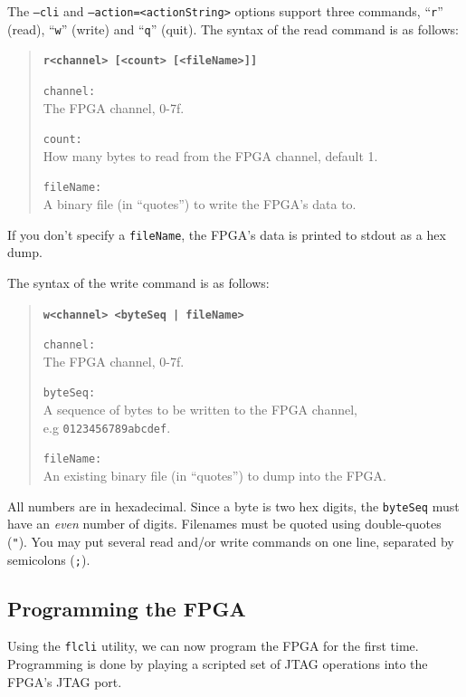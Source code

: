 \newpage
The \texttt{--cli} and \texttt{--action=<actionString>} options support three commands, ``\texttt{r}'' (read), ``\texttt{w}'' (write) and ``\texttt{q}'' (quit). The syntax of the read command is as follows:

\begin{quote}
\textbf{\texttt{r<channel> [<count> [<fileName>]]}}

\begin{desc}
  \item[\texttt{channel:}] \hfill \\
    The FPGA channel, 0-7f.
  \item[\texttt{count:}] \hfill \\
    How many bytes to read from the FPGA channel, default 1.
  \item[\texttt{fileName:}] \hfill \\
    A binary file (in ``quotes'') to write the FPGA's data to.
\end{desc}
\end{quote}

If you don't specify a \texttt{fileName}, the FPGA's data is printed to stdout as a hex dump.

The syntax of the write command is as follows:

\begin{quote}
\textbf{\texttt{w<channel> <byteSeq | fileName>}}

\begin{desc}
  \item[\texttt{channel:}] \hfill \\
    The FPGA channel, 0-7f.
  \item[\texttt{byteSeq:}] \hfill \\
    A sequence of bytes to be written to the FPGA channel,\\e.g \texttt{0123456789abcdef}.
  \item[\texttt{fileName:}] \hfill \\
    An existing binary file (in ``quotes'') to dump into the FPGA.
\end{desc}
\end{quote}

All numbers are in hexadecimal. Since a byte is two hex digits, the \texttt{byteSeq} must have an \textit{even} number of digits. Filenames must be quoted using double-quotes (\texttt{"}). You may put several read and/or write commands on one line, separated by semicolons (\texttt{;}).

\newpage
\subsection{Programming the FPGA}
Using the \texttt{flcli} utility, we can now program the FPGA for the first time. Programming is done by playing a scripted set of JTAG operations into the FPGA's JTAG port.

